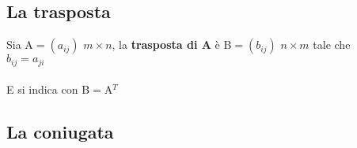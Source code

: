 \subsection{La trasposta}
Sia A$=(a_{ij})$ $m\times n$, la \textbf{trasposta di A} è B$=(b_{ij})$ $n\times m$ tale che \\

$b_{ij}=a_{ji}$\\\\
E si indica con B$=$A$^T$
\subsection{La coniugata}








